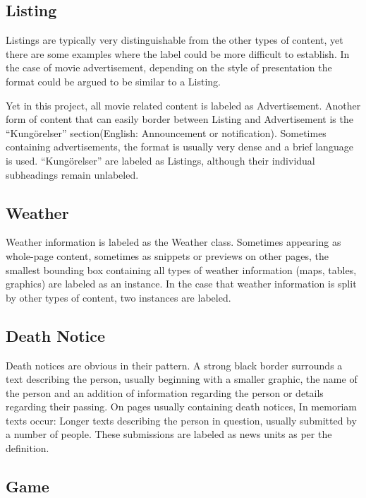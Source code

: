 \documentclass[english, bibtex]{kththesis}
\begin{document}
\subsection{Listing}

Listings are typically very distinguishable from the other types of content, yet there are some examples where the label could be more difficult to establish. In the case of movie advertisement, depending on the style of presentation the format could be argued to be similar to a Listing.

Yet in this project, all movie related content is labeled as Advertisement. Another form of content that can easily border between Listing and Advertisement is the “Kungörelser” section(English: Announcement or notification). Sometimes containing advertisements, the format is usually very dense and a brief language is used. “Kungörelser” are labeled as Listings, although their individual subheadings remain unlabeled.

\subsection{Weather}

Weather information is labeled as the Weather class. Sometimes appearing as whole-page content, sometimes as snippets or previews on other pages, the smallest bounding box containing all types of weather information (maps, tables, graphics) are labeled as an instance. In the case that weather information is split by other types of content, two instances are labeled.

\subsection{Death Notice}

Death notices are obvious in their pattern. A strong black border surrounds a text describing the person, usually beginning with a smaller graphic, the name of the person and an addition of information regarding the person or details regarding their passing. On pages usually containing death notices, In memoriam texts occur: Longer texts describing the person in question, usually submitted by a number of people. These submissions are labeled as news units as per the definition. 

\subsection{Game}
\end{document}
